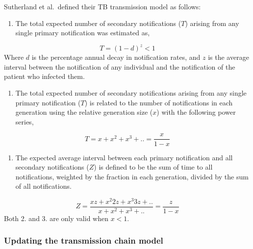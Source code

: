 \documentclass[11pt,twoside]{bristolthesis}
\providecommand{\tightlist}{%
  \setlength{\itemsep}{0pt}\setlength{\parskip}{0pt}}
\begin{document}
  Sutherland et al.~defined their TB transmission model as follows:
  \begin{enumerate}
  \def\labelenumi{\arabic{enumi}.}
  \tightlist
  \item
    The total expected number of secondary notifications (\(T\)) arising from any single primary notification was estimated as,
  \end{enumerate}
  \begin{equation} 
    T = (1-d)^z < 1
  \end{equation}
  Where \(d\) is the percentage annual decay in notification rates, and \(z\) is the average interval between the notification of any individual and the notification of the patient who infected them.
  \begin{enumerate}
  \def\labelenumi{\arabic{enumi}.}
  \setcounter{enumi}{1}
  \tightlist
  \item
    The total expected number of secondary notifications arising from any single primary notification (\(T\)) is related to the number of notifications in each generation using the relative generation size (\(x\)) with the following power series,
  \end{enumerate}
  \begin{equation} 
    T=x+x^2+x^3+ . . = \frac{x}{1-x}
  \end{equation}
  \begin{enumerate}
  \def\labelenumi{\arabic{enumi}.}
  \setcounter{enumi}{2}
  \tightlist
  \item
    The expected average interval between each primary notification and all secondary notifications (\(Z\)) is defined to be the sum of time to all notifications, weighted by the fraction in each generation, divided by the sum of all notifications.
  \end{enumerate}
  \begin{equation} 
    Z = \frac{xz + x^{2}2z + x^{3}3z + . .}{x+x^2+x^3+ . . }= \frac{z}{1-x}
  \end{equation}
  Both 2. and 3. are only valid when \(x < 1\).
  
  \hypertarget{updating-the-transmission-chain-model}{%
  \subsubsection{Updating the transmission chain model}\label{updating-the-transmission-chain-model}}
  
\end{document}
